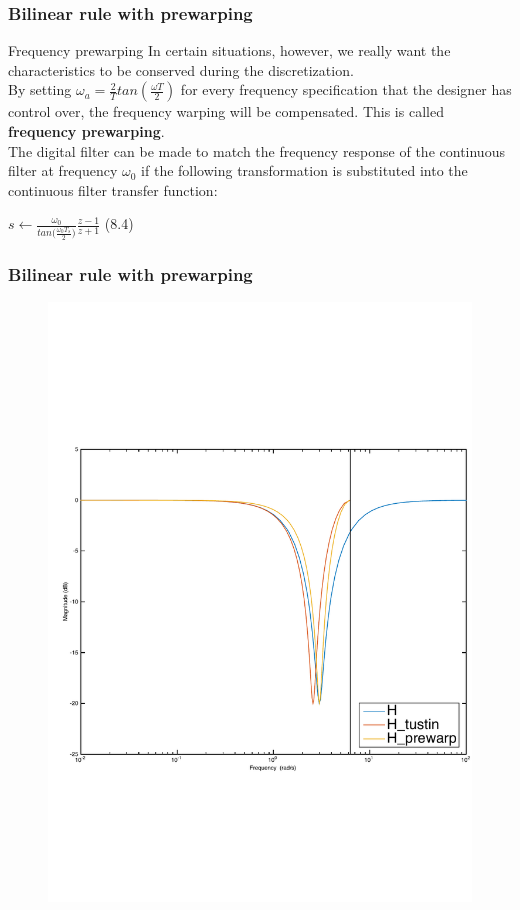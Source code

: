 \begin{frame}
	\frametitle{Bilinear rule with prewarping}
	\begin{block}{Frequency prewarping}
		In certain situations, however, we really want the characteristics to be conserved during the discretization.\\
		\vspace{1em}
		By setting $\omega_a = \frac{2}{T} tan(\frac{\omega T}{2})$ for every frequency specification that the designer has control over, the frequency warping will be compensated. This is called \textbf{frequency prewarping}.\\
		\vspace{1em}
		The digital filter can be made to match the frequency response of the continuous filter at frequency  $\omega_0$  if the following transformation is substituted into the continuous filter transfer function:
		\begin{center}
			$s \gets \frac{\omega_0}{tan\big(\frac{\omega_0T_s}{2}\big)} \frac{z-1}{z+1}$ (8.4)
		\end{center}
	\end{block}
\end{frame}

\begin{frame}
	\frametitle{Bilinear rule with prewarping}
	\vspace{-0.5em}
	\begin{figure}
		\centering
		\includegraphics[width=0.77\linewidth]{Distortion_bode1}
	\end{figure}
\end{frame}

